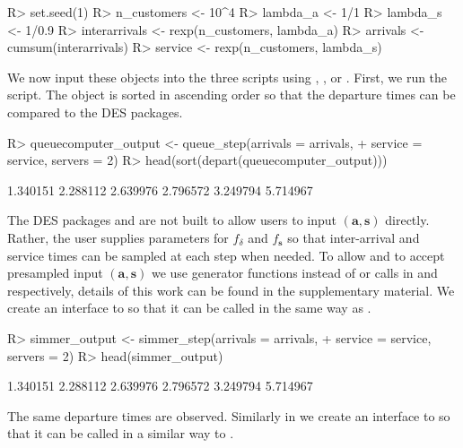 \documentclass[article]{jss}
\begin{document}
\begin{Code}
R> set.seed(1)
R> n_customers <- 10^4
R> lambda_a <- 1/1
R> lambda_s <- 1/0.9
R> interarrivals <- rexp(n_customers, lambda_a)
R> arrivals <- cumsum(interarrivals)
R> service <- rexp(n_customers, lambda_s)
\end{Code}

We now input these objects into the three scripts using , , or . First, we run the  script. The  object is sorted in ascending order so that the departure times can be compared to the DES packages.

\begin{CodeChunk}
\begin{Sinput}
R> queuecomputer_output <- queue_step(arrivals = arrivals, 
+    service = service, servers = 2)
R> head(sort(depart(queuecomputer_output)))
\end{Sinput}
\begin{Soutput}
[1] 1.340151 2.288112 2.639976 2.796572 3.249794 5.714967
\end{Soutput}
\end{CodeChunk}

The DES packages  and  are not built to allow users to input $(\mathbf{a,s})$ directly. Rather, the user supplies parameters for $f_{\delta}$ and $f_{\mathbf{s}}$ so that inter-arrival and service times can be sampled at each step when needed. To allow  and  to accept presampled input $(\mathbf{a,s})$ we use generator functions instead of  or  calls in  and  respectively, details of this work can be found in the supplementary material. We create an interface to  so that it can be called in the same way as . 

\begin{CodeChunk}
\begin{Sinput}
R> simmer_output <- simmer_step(arrivals = arrivals, 
+    service = service, servers = 2)
R> head(simmer_output)
\end{Sinput}
\begin{Soutput}
[1] 1.340151 2.288112 2.639976 2.796572 3.249794 5.714967
\end{Soutput}
\end{CodeChunk}

The same departure times are observed. Similarly in  we create an interface to  so that it can be called in a similar way to . 
\end{document}
